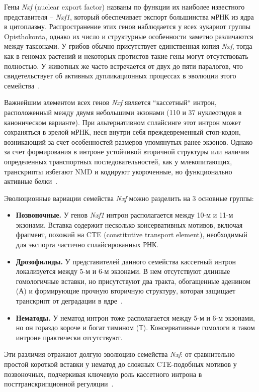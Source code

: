 Гены \textit{Nxf} (nuclear export factor) названы по функции их наиболее известного представителя – \textit{Nxf1}, который обеспечивает экспорт большинства мРНК из ядра в цитоплазму.
Распространение этих генов наблюдается у всех эукариот группы Opisthokonta, однако их число и структурные особенности заметно различаются между таксонами.
У грибов обычно присутствует единственная копия \textit{Nxf}, тогда как в геномах растений и некоторых протистов такие гены могут отсутствовать полностью.
У животных же часто встречается от двух до пяти паралогов, что свидетельствует об активных дупликационных процессах в эволюции этого семейства~\cite{Mamon2013}.

Важнейшим элементом всех генов \textit{Nxf} является ``кассетный`` интрон, расположенный между двумя небольшими экзонами (110 и 37 нуклеотидов в каноническом варианте).
При альтернативном сплайсинге этот интрон может сохраняться в зрелой мРНК, неся внутри себя преждевременный стоп-кодон, возникающий за счет особенностей размеров упомянутых ранее экзонов.
Однако за счет формирования в интроне устойчивой вторичной структуры или наличия определенных транспортных последовательностей, как у млекопитающих, транскрипты избегают NMD и кодируют укороченные, но функционально активные белки~\cite{Mamon2013,Golubkova2012}.

Эволюционные вариации семейства \textit{Nxf} можно разделить на 3 основные группы:

\begin{itemize}
  \item \textbf{Позвоночные.} У генов \textit{Nxf1} интрон располагается между 10-м и 11-м экзонами. Вставка содержит несколько консервативных мотивов, включая фрагмент, похожий на CTE (constitutive transport element), необходимый для экспорта частично сплайсированных РНК.
  \item \textbf{Дрозофилиды.} У представителей данного семейства кассетный интрон локализуется между 5-м и 6-м экзонами. В нем отсутствуют длинные гомологичные вставки, но присутствуют два тракта, обогащенные аденином (А) и формирующие прочную вторичную структуру, которая защищает транскрипт от деградации в ядре~\cite{Mamon2013,Roy2006}.
  \item \textbf{Нематоды.} У нематод интрон тоже располагается между 5-м и 6-м экзонами, но он гораздо короче и богат тимином (Т). Консервативные гомологи в таком интроне практически отсутствуют.
\end{itemize}

Эти различия отражают долгую эволюцию семейства \textit{Nxf}: от сравнительно простой короткой вставки у нематод до сложных CTE-подобных мотивов у позвоночных, подчеркивая ключевую роль кассетного интрона в посттранскрипционной регуляции~\cite{Mamon2013,Golubkova2012}.


